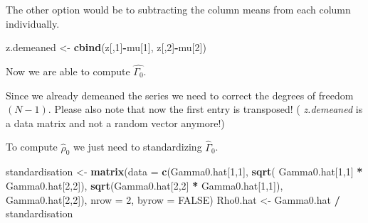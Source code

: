 \documentclass[12pt,a4paper]{article}
\newenvironment{Shaded}{\begin{snugshade}}{\end{snugshade}}
\newcommand{\DataTypeTok}[1]{\textcolor[rgb]{0.13,0.29,0.53}{#1}}
\newcommand{\DecValTok}[1]{\textcolor[rgb]{0.00,0.00,0.81}{#1}}
\newcommand{\KeywordTok}[1]{\textcolor[rgb]{0.13,0.29,0.53}{\textbf{#1}}}
\newcommand{\NormalTok}[1]{#1}
\newcommand{\OperatorTok}[1]{\textcolor[rgb]{0.81,0.36,0.00}{\textbf{#1}}}
\newcommand{\OtherTok}[1]{\textcolor[rgb]{0.56,0.35,0.01}{#1}}
\newcommand{\StringTok}[1]{\textcolor[rgb]{0.31,0.60,0.02}{#1}}
\begin{document}
The other option would be to subtracting the column means from each
column individually.

\begin{Shaded}
\begin{Highlighting}[]
\NormalTok{z.demeaned <-}\StringTok{ }\KeywordTok{cbind}\NormalTok{(z[,}\DecValTok{1}\NormalTok{]}\OperatorTok{-}\NormalTok{mu[}\DecValTok{1}\NormalTok{], z[,}\DecValTok{2}\NormalTok{]}\OperatorTok{-}\NormalTok{mu[}\DecValTok{2}\NormalTok{])}
\end{Highlighting}
\end{Shaded}

Now we are able to compute \(\widehat{\Gamma_0}\).

\begin{Shaded}
\end{Shaded}

Since we already demeaned the series we need to correct the degrees of
freedom \((N - 1)\). Please also note that now the first entry is
transposed! ( \emph{z.demeaned} is a data matrix and not a random vector
anymore!)

To compute \(\widehat{\rho}_0\) we just need to standardizing
\(\widehat{\Gamma}_0\).

\begin{Shaded}
\begin{Highlighting}[]
\NormalTok{standardisation <-}\StringTok{ }\KeywordTok{matrix}\NormalTok{(}\DataTypeTok{data =} \KeywordTok{c}\NormalTok{(Gamma0.hat[}\DecValTok{1}\NormalTok{,}\DecValTok{1}\NormalTok{], }
                                   \KeywordTok{sqrt}\NormalTok{( Gamma0.hat[}\DecValTok{1}\NormalTok{,}\DecValTok{1}\NormalTok{] }\OperatorTok{*}\StringTok{ }\NormalTok{Gamma0.hat[}\DecValTok{2}\NormalTok{,}\DecValTok{2}\NormalTok{]),}
                                   \KeywordTok{sqrt}\NormalTok{(Gamma0.hat[}\DecValTok{2}\NormalTok{,}\DecValTok{2}\NormalTok{] }\OperatorTok{*}\StringTok{ }\NormalTok{Gamma0.hat[}\DecValTok{1}\NormalTok{,}\DecValTok{1}\NormalTok{]),}
\NormalTok{                                   Gamma0.hat[}\DecValTok{2}\NormalTok{,}\DecValTok{2}\NormalTok{]),}
                       \DataTypeTok{nrow =} \DecValTok{2}\NormalTok{, }\DataTypeTok{byrow =} \OtherTok{FALSE}\NormalTok{) }
\NormalTok{Rho0.hat <-}\StringTok{ }\NormalTok{Gamma0.hat }\OperatorTok{/}\StringTok{ }\NormalTok{standardisation}
\end{Highlighting}
\end{Shaded}
\end{document}
